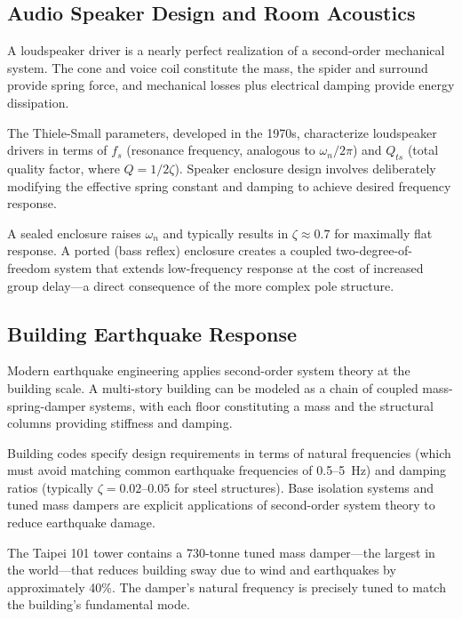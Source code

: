 \subsection{Audio Speaker Design and Room Acoustics}

A loudspeaker driver is a nearly perfect realization of a second-order mechanical system. The cone and voice coil constitute the mass, the spider and surround provide spring force, and mechanical losses plus electrical damping provide energy dissipation.

The Thiele-Small parameters, developed in the 1970s, characterize loudspeaker drivers in terms of $f_s$ (resonance frequency, analogous to $\omega_n/2\pi$) and $Q_{ts}$ (total quality factor, where $Q = 1/2\zeta$). Speaker enclosure design involves deliberately modifying the effective spring constant and damping to achieve desired frequency response.

A sealed enclosure raises $\omega_n$ and typically results in $\zeta \approx 0.7$ for maximally flat response. A ported (bass reflex) enclosure creates a coupled two-degree-of-freedom system that extends low-frequency response at the cost of increased group delay---a direct consequence of the more complex pole structure.

\subsection{Building Earthquake Response}

Modern earthquake engineering applies second-order system theory at the building scale. A multi-story building can be modeled as a chain of coupled mass-spring-damper systems, with each floor constituting a mass and the structural columns providing stiffness and damping.

Building codes specify design requirements in terms of natural frequencies (which must avoid matching common earthquake frequencies of 0.5--5~Hz) and damping ratios (typically $\zeta = 0.02$--$0.05$ for steel structures). Base isolation systems and tuned mass dampers are explicit applications of second-order system theory to reduce earthquake damage.

The Taipei 101 tower contains a 730-tonne tuned mass damper---the largest in the world---that reduces building sway due to wind and earthquakes by approximately 40\%. The damper's natural frequency is precisely tuned to match the building's fundamental mode.

